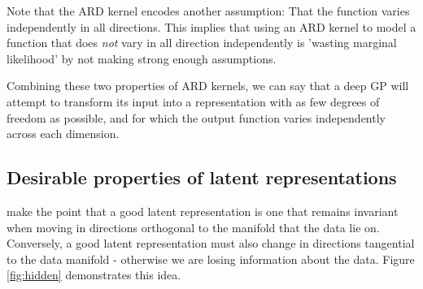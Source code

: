 \documentclass{article}
\begin{document}
Note that the ARD kernel encodes another assumption:  That the function varies independently in all directions.  This implies that using an ARD kernel to model a function that does \emph{not} vary in all direction independently is 'wasting marginal likelihood' by not making strong enough assumptions.

Combining these two properties of ARD kernels, we can say that a deep GP will attempt to transform its input into a representation with as few degrees of freedom as possible, and for which the output function varies independently across each dimension.

\subsection{Desirable properties of latent representations}

\cite{rifai2011higher} make the point that a good latent representation is one that remains invariant when moving in directions orthogonal to the manifold that the data lie on.  Conversely, a good latent representation must also change in directions tangential to the data manifold - otherwise we are losing information about the data.  Figure \ref{fig:hidden} demonstrates this idea.
\end{document}

